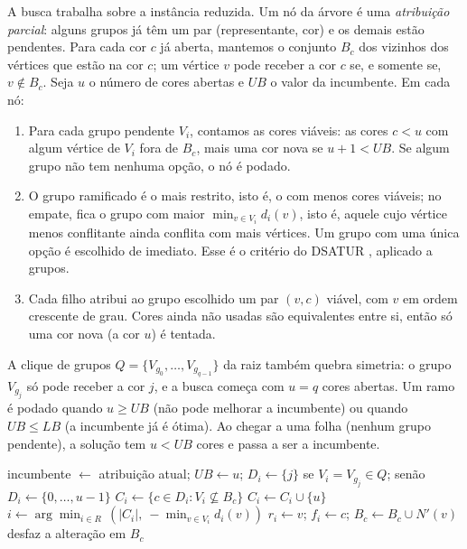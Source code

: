 \documentclass[12pt]{article}
\newcommand{\LB}{\mathit{LB}}
\newcommand{\UB}{\mathit{UB}}
\begin{document}
A busca trabalha sobre a instância reduzida. Um nó da árvore é uma
\emph{atribuição parcial}: alguns grupos já têm um par (representante, cor) e
os demais estão pendentes. Para cada cor $c$ já aberta, mantemos o conjunto
$B_c$ dos vizinhos dos vértices que estão na cor $c$; um vértice $v$ pode
receber a cor $c$ se, e somente se, $v\notin B_c$. Seja $u$ o número de cores
abertas e $\UB$ o valor da incumbente. Em cada nó:

\begin{enumerate}
  \item Para cada grupo pendente $V_i$, contamos as cores viáveis: as cores
    $c<u$ com algum vértice de $V_i$ fora de $B_c$, mais uma cor nova se
    $u+1<\UB$. Se algum grupo não tem nenhuma opção, o nó é podado.
  \item O grupo ramificado é o mais restrito, isto é, o com menos cores
    viáveis; no empate, fica o grupo com maior $\min_{v\in V_i}d_i(v)$, isto é,
    aquele cujo vértice menos conflitante ainda conflita com mais vértices.
    Um grupo com uma única opção é escolhido de imediato. Esse é o critério do
    DSATUR \cite{brelaz1979}, aplicado a grupos.
  \item Cada filho atribui ao grupo escolhido um par $(v,c)$ viável, com $v$
    em ordem crescente de grau. Cores ainda não usadas são equivalentes entre
    si, então só uma cor nova (a cor $u$) é tentada.
\end{enumerate}

A clique de grupos $Q=\{V_{g_0},\dots,V_{g_{q-1}}\}$ da raiz também quebra
simetria: o grupo $V_{g_j}$ só pode receber a cor $j$, e a busca começa com
$u=q$ cores abertas. Um ramo é podado quando $u\ge\UB$ (não pode melhorar a
incumbente) ou quando $\UB\le\LB$ (a incumbente já é ótima). Ao chegar a uma
folha (nenhum grupo pendente), a solução tem $u<\UB$ cores e passa a ser a
incumbente.

\begin{algorithm}[ht]
  \caption{Busca do \emph{branch and bound}}\label{alg:bb}
  \begin{algorithmic}[1]
     
      \If{$u \ge \UB$ \textbf{ou} $\UB \le \LB$} \Return \EndIf
        \State incumbente $\gets$ atribuição atual; \quad $\UB \gets u$; \quad \Return
      \EndIf
        \State $D_i \gets \{j\}$ se $V_i=V_{g_j}\in Q$; senão $D_i\gets\{0,\dots,u-1\}$
        \State $C_i \gets \{c\in D_i : V_i\not\subseteq B_c\}$
        \If{$V_i\notin Q$ \textbf{e} $u+1<\UB$} $C_i\gets C_i\cup\{u\}$ \EndIf
         \Return {} \EndIf
      \EndFor
      \State $i \gets \arg\min_{i\in R}\,(|C_i|,\ -\min_{v\in V_i} d_i(v))$
        \State $r_i\gets v$; \quad $f_i\gets c$; \quad $B_c \gets B_c\cup N'(v)$
        \State {}
        \State desfaz a alteração em $B_c$
      \EndFor
    \EndProcedure
  \end{algorithmic}
\end{algorithm}
\end{document}
